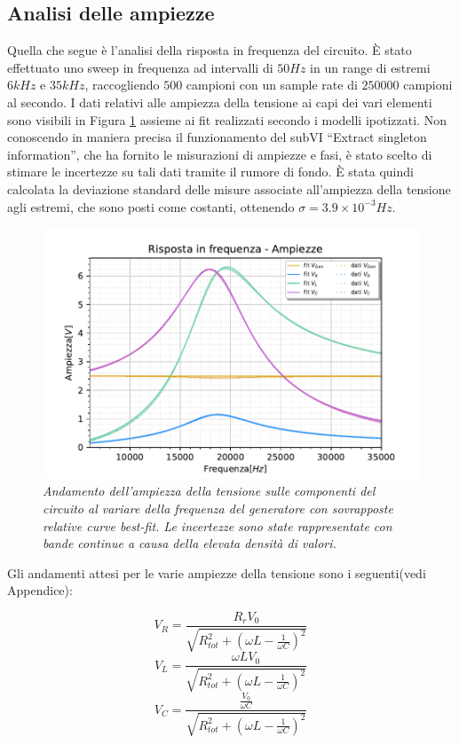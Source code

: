 \subsection{Analisi delle ampiezze}

Quella che segue è l'analisi della risposta in frequenza del circuito.
È stato effettuato uno sweep in frequenza ad intervalli di $50Hz$ in un range di estremi $6kHz$ e $35kHz$, raccogliendo
$500$ campioni con un sample rate di $250000$ campioni al secondo.
I dati relativi alle ampiezza della tensione ai capi dei vari elementi sono visibili in Figura \ref{fig:ampiezzeRLC}
assieme ai fit realizzati secondo i modelli ipotizzati.
Non conoscendo in maniera precisa il funzionamento del subVI ``Extract singleton information'', che ha fornito le misurazioni
di ampiezze e fasi, è stato scelto di stimare le incertezze su tali dati tramite il rumore di fondo. È stata quindi
calcolata la deviazione standard delle misure associate all’ampiezza della tensione agli estremi, che sono posti
come costanti, ottenendo $\sigma = 3.9 \times 10^{-3} Hz$.
\begin{figure}[h]
    \centering
    \includegraphics[width=.8\textwidth]{../figs/Risposta-in-frequenza-ampiezze.pdf}
    \caption{\emph{Andamento dell’ampiezza della tensione sulle componenti del circuito al variare
    della frequenza del generatore con sovrapposte relative curve best-fit. Le incertezze sono state
    rappresentate con bande continue a causa della elevata densità di valori.}}
    \label{fig:ampiezzeRLC}
\end{figure}

Gli andamenti attesi per le varie ampiezze della tensione sono i seguenti(vedi Appendice):

\begin{equation}\label{eq:amp-V_R}
    V_R = \frac{R_rV_0}{\sqrt{ R_{tot}^2 +{ \left(\omega L - \frac{1}{\omega C}\right)}^2}}
\end{equation}
\begin{equation}
    V_L = \frac{\omega L V_0}{\sqrt{R_{tot}^2+{ \left(\omega L - \frac{1}{\omega C}\right)}^2}}
\end{equation}
\begin{equation}
    V_C = \frac{\frac{V_0}{\omega C}}{\sqrt{R_{tot}^2+{ \left(\omega L - \frac{1}{\omega C}\right)}^2}}
\end{equation}


